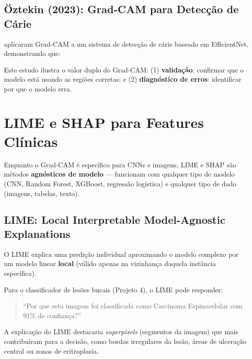 \subsection{Öztekin (2023): Grad-CAM para Detecção de Cárie}

 aplicaram Grad-CAM a um sistema de detecção
de cárie baseado em EfficientNet, demonstrando que:


Este estudo ilustra o valor duplo do Grad-CAM: (1) \textbf{validação}:
confirmar que o modelo está usando as regiões corretas; e (2)
\textbf{diagnóstico de erros}: identificar por que o modelo erra.

\section{LIME e SHAP para Features Clínicas}

Enquanto o Grad-CAM é específico para CNNs e imagens, LIME e SHAP são
métodos \textbf{agnósticos de modelo} — funcionam com qualquer tipo de
modelo (CNN, Random Forest, XGBoost, regressão logística) e qualquer
tipo de dado (imagens, tabelas, texto).

\subsection{LIME: Local Interpretable Model-Agnostic Explanations}

O LIME \cite{ribeiro2016lime} explica uma predição individual aproximando
o modelo complexo por um modelo linear \textbf{local} (válido apenas na
vizinhança daquela instância específica).

Para o classificador de lesões bucais (Projeto 4), o LIME pode responder:

\begin{quote}
  ``Por que esta imagem foi classificada como Carcinoma Espinocelular
  com 91\% de confiança?''
\end{quote}

A explicação do LIME destacaria \textit{superpixels} (segmentos da imagem)
que mais contribuíram para a decisão, como bordas irregulares da lesão,
áreas de ulceração central ou zonas de eritroplasia.

